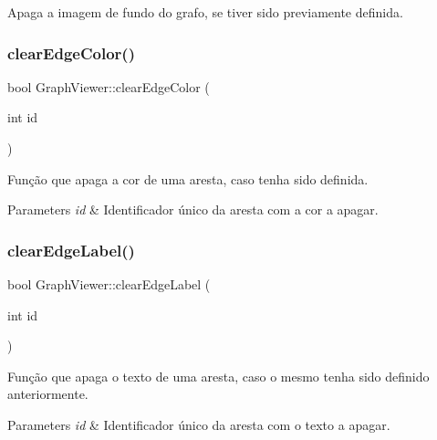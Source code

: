 Apaga a imagem de fundo do grafo, se tiver sido previamente definida. \mbox{\label{class_graph_viewer_a0e3bb8f6d7290e141c141ca83c9eb67a}} 
\subsubsection{\texorpdfstring{clear\+Edge\+Color()}{clearEdgeColor()}}
{\footnotesize\ttfamily bool Graph\+Viewer\+::clear\+Edge\+Color (\begin{DoxyParamCaption}\item[{int}]{id }\end{DoxyParamCaption})}

Função que apaga a cor de uma aresta, caso tenha sido definida.


\begin{DoxyParams}{Parameters}
{\em id} & Identificador único da aresta com a cor a apagar. \\
\hline
\end{DoxyParams}
\mbox{\label{class_graph_viewer_a8b90527371bd990806eb32620be765be}} 
\subsubsection{\texorpdfstring{clear\+Edge\+Label()}{clearEdgeLabel()}}
{\footnotesize\ttfamily bool Graph\+Viewer\+::clear\+Edge\+Label (\begin{DoxyParamCaption}\item[{int}]{id }\end{DoxyParamCaption})}

Função que apaga o texto de uma aresta, caso o mesmo tenha sido definido anteriormente.


\begin{DoxyParams}{Parameters}
{\em id} & Identificador único da aresta com o texto a apagar. \\
\hline
\end{DoxyParams}
\mbox{\label{class_graph_viewer_a70e2f6cc24e545a66312a92cf5839d25}} 
